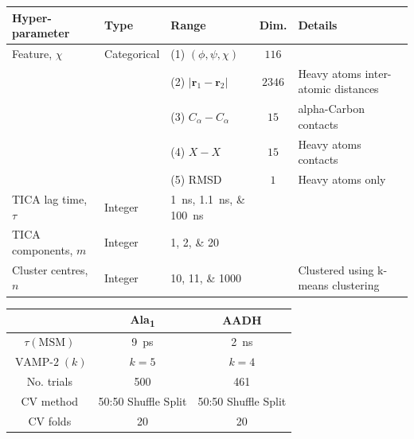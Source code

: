 \begin{table}
    \centering
    \begin{tabularx}{0.9\textwidth}{ |>{\raggedright\arraybackslash}l|l|>{\raggedright\arraybackslash}X|c| >{\raggedright\arraybackslash}X | } 
    \hline
    \textbf{Hyper-parameter} & \textbf{Type} & \textbf{Range} & \textbf{Dim.} &\textbf{Details} \\
     \hline\hline
    Feature, $\chi$ & Categorical & (1) $(\phi, \psi, \chi)$ & $\num{116}$  & \\
    & & (2) $|\mathbf{r}_{1}-\mathbf{r}_{2}|$  & $\num{ 2346}$& Heavy atoms inter-atomic distances \\
    & & (3) $C_{\alpha}-C_{\alpha}$ & $\num{15}$ & alpha-Carbon contacts\\ 
    & & (4) $X-X$  & $\num{15}$ & Heavy atoms contacts\\ 
    & & (5) RMSD & $\num{1}$ &  Heavy atoms only\\ 
    \hline
    TICA lag time, $\tau$ & Integer &\SIlist[list-final-separator = { ... }]{1;1.1;100}{ns} &  & \\
    \hline
    TICA components, $m$& Integer &\numlist[list-final-separator = { ... }]{1;2;20} & & \\
    \hline
    Cluster centres, $n$ & Integer & \numlist[list-final-separator = { ... }]{10;11;1000}& &  Clustered using k-means clustering  \\
    
     \hline
    \end{tabularx}
    \label{tab:aadh_searchspace}
\end{table}

\begin{table}
    \centering
    \begin{tabular}{|c|c|c|}
    \hline
    & Ala\textsubscript{1} & AADH \\
    \hline\hline
    $\tau(\mathrm{MSM})$ & \SI{9}{\pico\second} & \SI{2}{\nano\second} \\         
    $\operatorname{VAMP-2}(k)$ & $k=5$ & $k=4$ \\
    No. trials & 500 & 461 \\
    CV method & 50:50 Shuffle Split & 50:50 Shuffle Split \\
    CV folds & 20 & 20 \\
     \hline       
    \end{tabular}
    \label{tab:trial_specs}
\end{table}




